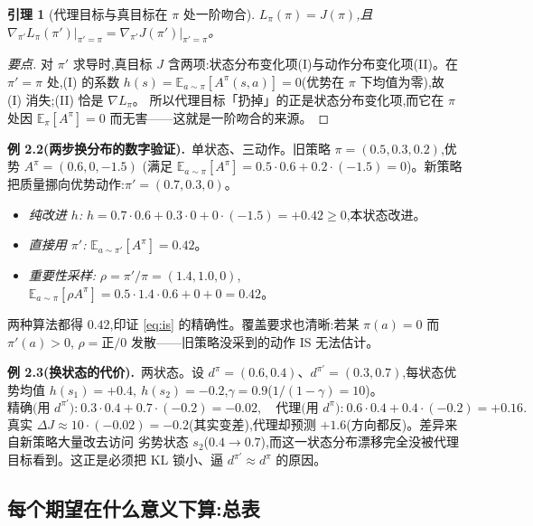 \documentclass[11pt]{article}
\newcommand{\E}{\mathbb{E}}
\newcommand{\Ap}{A^{\pi}}
\newcommand{\dpi}{d^{\pi}}
\newcommand{\dpip}{d^{\pi'}}
\theoremstyle{plain}
\newtheorem{lemma}[theorem]{引理}
\theoremstyle{definition}
\theoremstyle{remark}
\begin{document}
\begin{lemma}[代理目标与真目标在 $\pi$ 处一阶吻合]
$L_\pi(\pi)=J(\pi)$,且 $\nabla_{\pi'}L_\pi(\pi')\big|_{\pi'=\pi}=\nabla_{\pi'}J(\pi')\big|_{\pi'=\pi}$。
\end{lemma}
\begin{proof}[要点]
对 $\pi'$ 求导时,真目标 $J$ 含两项:状态分布变化项(I)与动作分布变化项(II)。在 $\pi'=\pi$ 处,(I) 的系数
$h(s)=\E_{a\sim\pi}[\Ap(s,a)]=0$(优势在 $\pi$ 下均值为零),故 (I) 消失;(II) 恰是 $\nabla L_\pi$。
所以代理目标「扔掉」的正是状态分布变化项,而它在 $\pi$ 处因 $\E_\pi[\Ap]=0$ 而无害——这就是一阶吻合的来源。
\end{proof}

\begin{exbox}
\textbf{例 2.2(两步换分布的数字验证).}\ 单状态、三动作。旧策略 $\pi=(0.5,0.3,0.2)$,优势 $\Ap=(0.6,0,-1.5)$
(满足 $\E_{a\sim\pi}[\Ap]=0.5\cdot0.6+0.2\cdot(-1.5)=0$)。新策略把质量挪向优势动作:$\pi'=(0.7,0.3,0)$。
\begin{itemize}[topsep=2pt,itemsep=1pt]
\item \emph{纯改进 $h$:} $h=0.7\cdot0.6+0.3\cdot0+0\cdot(-1.5)=+0.42\ge0$,本状态改进。
\item \emph{直接用 $\pi'$:} $\E_{a\sim\pi'}[\Ap]=0.42$。
\item \emph{重要性采样:} $\rho=\pi'/\pi=(1.4,1.0,0)$,$\E_{a\sim\pi}[\rho\Ap]=0.5\cdot1.4\cdot0.6+0+0=0.42$。
\end{itemize}
两种算法都得 $0.42$,印证 \eqref{eq:is} 的精确性。覆盖要求也清晰:若某 $\pi(a)=0$ 而 $\pi'(a)>0$,
$\rho=\text{正}/0$ 发散——旧策略没采到的动作 IS 无法估计。
\end{exbox}

\begin{exbox}
\textbf{例 2.3(换状态的代价).}\ 两状态。设 $\dpi=(0.6,0.4)$、$\dpip=(0.3,0.7)$,每状态优势均值
$h(s_1)=+0.4,\ h(s_2)=-0.2$,$\gamma=0.9$($1/(1-\gamma)=10$)。
\[
\text{精确(用 $\dpip$):}\ 0.3\cdot0.4+0.7\cdot(-0.2)=-0.02,\quad
\text{代理(用 $\dpi$):}\ 0.6\cdot0.4+0.4\cdot(-0.2)=+0.16.
\]
真实 $\Delta J\approx10\cdot(-0.02)=-0.2$(其实变差),代理却预测 $+1.6$(方向都反)。差异来自新策略大量改去访问
劣势状态 $s_2$($0.4\to0.7$),而这一状态分布漂移完全没被代理目标看到。这正是必须把 KL 锁小、逼 $\dpip\approx\dpi$ 的原因。
\end{exbox}

\subsection{每个期望在什么意义下算:总表}
\end{document}
